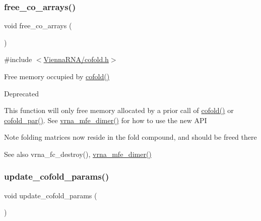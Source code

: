 \subsubsection{\texorpdfstring{free\+\_\+co\+\_\+arrays()}{free\_co\_arrays()}}
{\footnotesize\ttfamily void free\+\_\+co\+\_\+arrays (\begin{DoxyParamCaption}\item[{void}]{ }\end{DoxyParamCaption})}



{\ttfamily \#include $<$\mbox{\hyperlink{cofold_8h}{Vienna\+R\+N\+A/cofold.\+h}}$>$}



Free memory occupied by \mbox{\hyperlink{group__mfe__cofold_gabc8517f22cfe70595ee81fc837910d52}{cofold()}} 

\begin{DoxyRefDesc}{Deprecated}
\item[\mbox{\hyperlink{deprecated__deprecated000032}{Deprecated}}]This function will only free memory allocated by a prior call of \mbox{\hyperlink{group__mfe__cofold_gabc8517f22cfe70595ee81fc837910d52}{cofold()}} or \mbox{\hyperlink{group__mfe__cofold_ga7612cfeeb1b793f1e4179b1eb53df1f3}{cofold\+\_\+par()}}. See \mbox{\hyperlink{group__mfe__cofold_gaab22d10c1190f205f16a77cab9d5d3ee}{vrna\+\_\+mfe\+\_\+dimer()}} for how to use the new A\+PI\end{DoxyRefDesc}


\begin{DoxyNote}{Note}
folding matrices now reside in the fold compound, and should be free\textquotesingle{}d there 
\end{DoxyNote}
\begin{DoxySeeAlso}{See also}
vrna\+\_\+fc\+\_\+destroy(), \mbox{\hyperlink{group__mfe__cofold_gaab22d10c1190f205f16a77cab9d5d3ee}{vrna\+\_\+mfe\+\_\+dimer()}} 
\end{DoxySeeAlso}
\mbox{\label{group__mfe__cofold_ga4fcbf34e77b99bfbb2333d2ab0c41a57}} 
\subsubsection{\texorpdfstring{update\+\_\+cofold\+\_\+params()}{update\_cofold\_params()}}
{\footnotesize\ttfamily void update\+\_\+cofold\+\_\+params (\begin{DoxyParamCaption}\item[{void}]{ }\end{DoxyParamCaption})}



